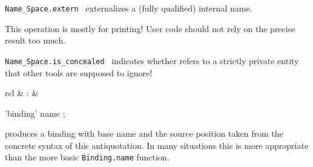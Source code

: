 \begin{isabellebody}
\begin{isamarkuptext}
\begin{description}
  \item \verb|Name_Space.extern|~ externalizes a
  (fully qualified) internal name.

  This operation is mostly for printing!  User code should not rely on
  the precise result too much.

  \item \verb|Name_Space.is_concealed|~ indicates
  whether  refers to a strictly private entity that
  other tools are supposed to ignore!

  \end{description}%
\end{isamarkuptext}%
\isamarkuptrue%
%
\endisatagmlref
{\isafoldmlref}%
%
\isadelimmlref
%
\endisadelimmlref
%
\isadelimmlantiq
%
\endisadelimmlantiq
%
\isatagmlantiq
%
\begin{isamarkuptext}%
\begin{matharray}{rcl}
  \hypertarget{ML antiquotation.binding}{\hyperlink{ML antiquotation.binding}{\mbox{}}} & : &  \\
  \end{matharray}

  \begin{rail}
  'binding' name
  ;
  \end{rail}

  \begin{description}

  \item {} produces a binding with base name
   and the source position taken from the concrete
  syntax of this antiquotation.  In many situations this is more
  appropriate than the more basic \verb|Binding.name| function.


\end{description}
\end{isamarkuptext}
\end{isabellebody}
